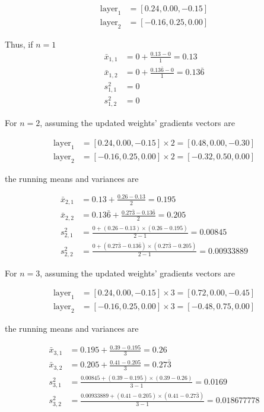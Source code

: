 \documentclass[10pt, a4paper]{article}
\begin{document}
\begin{align*}
\text{layer}_1 &= [ 0.24, 0.00, -0.15] \\
\text{layer}_2 &= [-0.16, 0.25, 0.00]
\end{align*}

Thus, if $n = 1$
\begin{align*}
\bar{x}_{1, 1} &= 0 + \frac{0.13 - 0}{1} = 0.13 \\
\bar{x}_{1, 2} &= 0 + \frac{0.13\bar{6} - 0}{1} = 0.13\bar{6}  \\
s^2_{1, 1} &= 0 \\
s^2_{1, 2} &= 0
\end{align*}

For $n=2$, assuming the updated weights' gradients vectors are 

\begin{align*}
\text{layer}_1 &= [ 0.24, 0.00, -0.15] \times 2 = [ 0.48, 0.00, -0.30] \\
\text{layer}_2 &= [-0.16, 0.25, 0.00] \times 2 = [-0.32, 0.50, 0.00] 
\end{align*}

the running means and variances are

\begin{align*}
\bar{x}_{2, 1} &= 0.13 + \frac{0.26 - 0.13}{2} = 0.195 \\
\bar{x}_{2, 2} &= 0.13\bar{6} + \frac{0.27\bar{3} - 0.13\bar{6}}{2} =  0.205\\
s^2_{2, 1} &= \frac{0 + (0.26 - 0.13)\times(0.26 - 0.195)}{2 - 1} = 0.00845\\
s^2_{2, 2} &= \frac{0 + (0.27\bar{3} - 0.13\bar{6})\times(0.27\bar{3} - 0.205)}{2 - 1} = 0.00933889
\end{align*}

For $n=3$, assuming the updated weights' gradients vectors are  

\begin{align*}
\text{layer}_1 &= [ 0.24, 0.00, -0.15] \times 3 = [ 0.72, 0.00, -0.45] \\
\text{layer}_2 &= [-0.16, 0.25, 0.00] \times 3 = [-0.48, 0.75, 0.00] 
\end{align*}

the running means and variances are

\begin{align*}
\bar{x}_{3, 1} &= 0.195 + \frac{0.39 - 0.195}{3} = 0.26 \\
\bar{x}_{3, 2} &= 0.205 + \frac{0.41 - 0.205}{3} = 0.27\bar{3} \\
s^2_{3, 1} &= \frac{0.00845 + (0.39 - 0.195)\times(0.39 - 0.26)}{3 - 1} = 0.0169\\
s^2_{3, 2} &= \frac{0.00933889 + (0.41 - 0.205)\times(0.41 - 0.27\bar{3})}{3 - 1} = 0.018677778
\end{align*}



\end{document}
